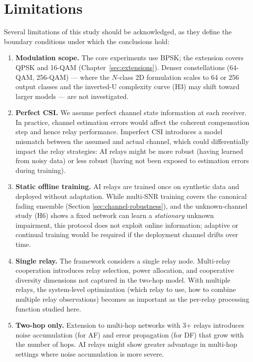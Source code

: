 \section{Limitations}\label{sec:limitations}

Several limitations of this study should be acknowledged, as they define the boundary conditions under which the conclusions hold:

\begin{enumerate}
\def\labelenumi{\arabic{enumi}.}
\item
  \textbf{Modulation scope.} The core experiments use BPSK; the extension covers QPSK and 16-QAM (Chapter~\ref{sec:extensions}). Denser constellations (64-QAM, 256-QAM) --- where the $N$-class 2D formulation scales to 64 or 256 output classes and the inverted-U complexity curve (H3) may shift toward larger models --- are not investigated.
\item
  \textbf{Perfect CSI.} We assume perfect channel state information at each receiver. In practice, channel estimation errors would affect the coherent compensation step and hence relay performance. Imperfect CSI introduces a model mismatch between the assumed and actual channel, which could differentially impact the relay strategies: AI relays might be more robust (having learned from noisy data) or less robust (having not been exposed to estimation errors during training).
\item
  \textbf{Static offline training.} AI relays are trained once on synthetic data and deployed without adaptation. While multi-SNR training covers the canonical fading ensemble (Section \ref{sec:channel-robustness}), and the unknown-channel study (H6) shows a fixed network can learn a \emph{stationary} unknown impairment, this protocol does not exploit online information; adaptive or continual training would be required if the deployment channel drifts over time.
\item
  \textbf{Single relay.} The framework considers a single relay node. Multi-relay cooperation introduces relay selection, power allocation, and cooperative diversity dimensions not captured in the two-hop model. With multiple relays, the system-level optimization (which relay to use, how to combine multiple relay observations) becomes as important as the per-relay processing function studied here.
\item
  \textbf{Two-hop only.} Extension to multi-hop networks with 3+ relays introduces noise accumulation (for AF) and error propagation (for DF) that grow with the number of hops. AI relays might show greater advantage in multi-hop settings where noise accumulation is more severe.

\end{enumerate}
